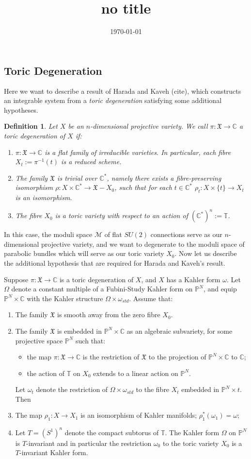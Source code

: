 \documentclass[]{article}
\title{no title}
\date{\today}
\newtheorem{definition}{Definition}
\newcommand{\C}{\mathbb{C}}
\newcommand{\MM}{\mathcal{M}}
\newcommand{\XX}{\mathfrak{X}}
\begin{document}
		
	\subsection{Toric Degeneration}
	Here we want to describe a result of Harada and Kaveh (cite), which constructs an integrable system from a \textit{toric degeneration} satisfying some additional hypotheses. 
	\begin{definition}
		\label{d:toricdegen}
		Let $X$ be an $n$-dimensional projective variety. We call $\pi: \XX\to\C$ a \emph{toric degeneration} of $X$ if:
		\begin{enumerate}
			\item $\pi:\XX\to\C$ is a flat family of irreducible varieties. In particular, each fibre $X_t := \pi^{-1}(t)$ is a reduced scheme.
			\item The family $\XX$ is trivial over $\C^\ast$, namely there exists a fibre-preserving isomorphism $\rho:X\times\C^\ast \to \XX - X_0$, such that for each $t\in \C^\ast$ $\rho_t:X\times\{t\} \to X_t$ is an isomorphism.
			\item The fibre $X_0$ is a toric variety with respect to an action of $(\C^\ast)^n := \mathbb{T}$.
		\end{enumerate}
	\end{definition}
	In this case, the moduli space $\MM$ of flat $SU(2)$ connections serve as our $n$-dimensional projective variety, and we want to degenerate to the moduli space of parabolic bundles which will serve as our toric variety $X_0$. Now let us describe the additional hypothesis that are required for Harada and Kaveh's result.
	
	Suppose $\pi:\XX\to\C$ is a toric degeneration of $X$, and $X$ has a Kahler form $\omega$. Let $\Omega$ denote a constant multiple of a Fubini-Study Kahler form on $\mathbb{P}^N$, and equip $\mathbb{P}^N\times\C$ with the Kahler structure $\Omega \times \omega_{std}$. Assume that:
	\begin{enumerate}
		\item The family $\XX$ is smooth away from the zero fibre $X_0$.
		\item The family $\XX$ is embedded in $\mathbb{P}^N\times \C$ as an algebraic subvariety, for some projective space $\mathbb{P}^N$ such that:
			\begin{itemize}
				\item the map $\pi:\XX\to\C$ is the restriction of $\XX$ to the projection of $\mathbb{P}^N\times \C$ to $\C$;
				\item the action of $\mathbb{T}$ on $X_0$ extends to a linear action on $\mathbb{P}^N$.
			\end{itemize}
		Let $\omega_t$ denote the restriction of $\Omega\times \omega_{std}$ to the fibre $X_t$ embedded in $\mathbb{P}^N \times {t}$. Then
		\item The map $\rho_1 : X\to X_1$ is an isomorphism of Kahler manifolds; $\rho_1^\ast(\omega_1) = \omega$;
		\item Let $T = (S^1)^n$ denote the compact subtorus of $\mathbb{T}$. The Kahler form $\Omega$ on $\mathbb{P}^N$ is $T$-invariant and in particular the restriction $\omega_0$ to the toric variety $X_0$ is a $T$-invariant Kahler form.
	\end{enumerate}
\end{document}
